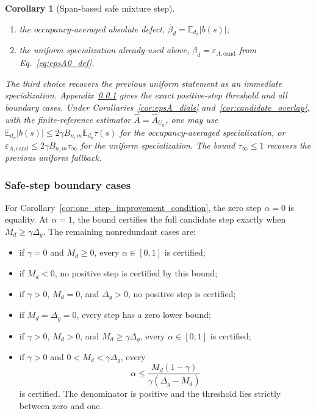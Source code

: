 \documentclass{article}
\theoremstyle{plain}
\newtheorem{corollary}[theorem]{Corollary}
\theoremstyle{definition}
\theoremstyle{remark}
\newcommand{\E}{\mathbb{E}}
\begin{document}
\begin{corollary}[Span-based safe mixture step]
\begin{enumerate}
\item the occupancy-averaged absolute defect,
$\overline{\beta}_d=\E_{d_\pi}|b(s)|$;
\item the uniform specialization already used above,
$\overline{\beta}_d=\varepsilon_{A,\mathrm{cand}}$ from
Eq.~\eqref{eq:epsA0_def}.
\end{enumerate}
The third choice recovers the previous uniform statement as an immediate
specialization. Appendix~\ref{app:safe_step_boundaries} gives the exact
positive-step threshold and all boundary cases.
Under Corollaries~\ref{cor:epsA_dials} and~\ref{cor:candidate_overlap},
with the finite-reference estimator $\widehat A=\widehat A_{U_n}$, one may use
$\E_{d_\pi}|b(s)|\le
2\gamma B_{n,m}\E_{d_\pi}\tau(s)$ for the occupancy-averaged
specialization, or
$\varepsilon_{A,\mathrm{cand}}\le2\gamma B_{n,m}\tau_\infty$ for the
uniform specialization. The bound $\tau_\infty\le1$ recovers the previous
uniform fallback.
\end{corollary}

\subsubsection{Safe-step boundary cases}
\label{app:safe_step_boundaries}

For Corollary~\ref{cor:one_step_improvement_condition}, the zero step
$\alpha=0$ is equality. At $\alpha=1$, the bound certifies the full candidate
step exactly when $M_d\ge\gamma\Delta_g$. The remaining nonredundant cases
are:
\begin{itemize}
\item if $\gamma=0$ and $M_d\ge0$, every $\alpha\in[0,1]$ is certified;
\item if $M_d<0$, no positive step is certified by this bound;
\item if $\gamma>0$, $M_d=0$, and $\Delta_g>0$, no positive step is certified;
\item if $M_d=\Delta_g=0$, every step has a zero lower bound;
\item if $\gamma>0$, $M_d>0$, and $M_d\ge\gamma\Delta_g$, every
$\alpha\in[0,1]$ is certified;
\item if $\gamma>0$ and $0<M_d<\gamma\Delta_g$, every
\begin{equation}
\alpha\le
\frac{M_d(1-\gamma)}{\gamma(\Delta_g-M_d)}
\label{eq:explicit_safe_step}
\end{equation}
is certified. The denominator is positive and the threshold lies strictly
between zero and one.
\end{itemize}
\end{document}
